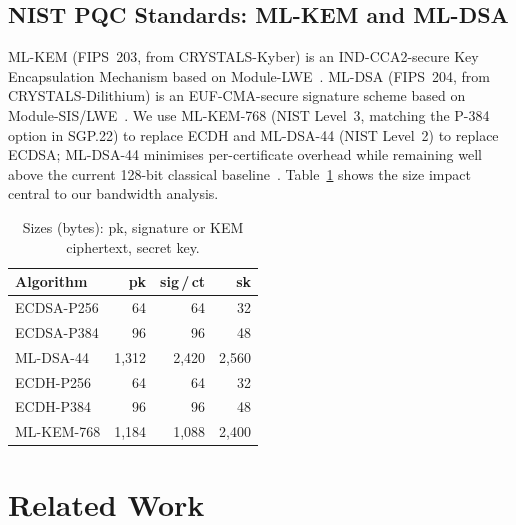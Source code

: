 \documentclass[final,3p,times,twocolumn]{elsarticle}
\begin{document}
\subsection{NIST PQC Standards: ML-KEM and ML-DSA}\label{sec:bg-pqc}

ML-KEM (FIPS~203, from CRYSTALS-Kyber) is an IND-CCA2-secure Key
Encapsulation Mechanism based on Module-LWE~\citep{nist_fips203}.
ML-DSA (FIPS~204, from CRYSTALS-Dilithium) is an EUF-CMA-secure signature
scheme based on Module-SIS/LWE~\citep{nist_fips204}.  We use ML-KEM-768
(NIST Level~3, matching the P-384 option in SGP.22) to replace ECDH and
ML-DSA-44 (NIST Level~2) to replace ECDSA; ML-DSA-44 minimises
per-certificate overhead while remaining well above the current 128-bit
classical baseline~\citep{demir2025pqc}.
Table~\ref{tab:pqc_sizes} shows the size impact central to our bandwidth
analysis.

\begin{table}[!htb]
\caption{Sizes (bytes): pk, signature or KEM ciphertext, secret key.}
\label{tab:pqc_sizes}
\centering
\footnotesize
\setlength{\tabcolsep}{4pt}
\renewcommand{\arraystretch}{1.05}
\begin{tabular}{@{}lrrr@{}}
\toprule
\textbf{Algorithm} & \textbf{pk} & \textbf{sig\,/\,ct} & \textbf{sk} \\
\midrule
ECDSA-P256  & 64  & 64   & 32 \\
ECDSA-P384  & 96  & 96   & 48 \\
ML-DSA-44   & 1{,}312 & 2{,}420 & 2{,}560 \\
\midrule
ECDH-P256   & 64  & 64   & 32 \\
ECDH-P384   & 96  & 96   & 48 \\
ML-KEM-768  & 1{,}184 & 1{,}088 & 2{,}400 \\
\bottomrule
\end{tabular}
\end{table}

\section{Related Work}\label{sec:related}
\end{document}
